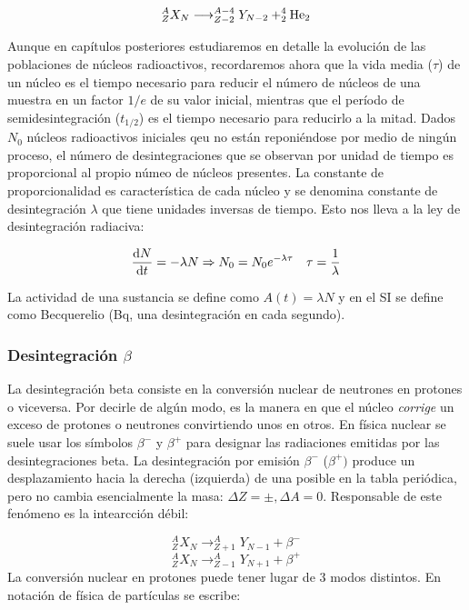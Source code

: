 \begin{equation}
    ^A_Z X_N \longrightarrow ^{A-4}_{Z-2} Y_{N-2} + ^4_2\text{He}_2
\end{equation}

Aunque en capítulos posteriores estudiaremos en detalle la evolución de las poblaciones de núcleos radioactivos, recordaremos ahora que la vida media ($\tau$) de un núcleo es el tiempo necesario para reducir el número de núcleos de una muestra en un factor $1/e$ de su valor inicial, mientras que el período de semidesintegración ($t_{1/2}$) es el tiempo necesario para reducirlo a la mitad. Dados $N_0$ núcleos radioactivos iniciales qeu no están reponiéndose por medio de ningún proceso, el número de desintegraciones que se observan por unidad de tiempo es proporcional al propio númeo de núcleos presentes. La constante de proporcionalidad es característica de cada núcleo y se denomina constante de desintegración $\lambda$ que tiene unidades inversas de tiempo. Esto nos lleva a la ley de desintegración radiaciva:

\begin{equation}
\frac{\mathrm{d} N}{\mathrm{d} t} = - \lambda N \Rightarrow N_0  = N_0 e^{-\lambda \tau} \quad \tau = \frac{1}{\lambda}
\end{equation}

La actividad de una sustancia se define como $A(t)=\lambda N$ y en el SI se define como Becquerelio (Bq, una desintegración en cada segundo).

\subsubsection{Desintegración $\beta$}

La desintegración beta consiste en la conversión nuclear de neutrones en protones o viceversa. Por decirle de algún modo, es la manera en que el núcleo \textit{corrige} un exceso de protones o neutrones convirtiendo unos en otros. En física nuclear se suele usar los símbolos $\beta^-$ y $\beta^+$ para designar las radiaciones emitidas por las desintegraciones beta. La desintegración por emisión $\beta^-$ ($\beta^+)$ produce un desplazamiento hacia la derecha (izquierda) de una posible en la tabla periódica, pero no cambia esencialmente la masa: $\Delta Z = \pm, \Delta A = 0$. Responsable de este fenómeno es la intearcción débil:

\begin{equation}
^A_Z X_N \longrightarrow ^A_{Z+1} Y_{N-1} + \beta^-
\end{equation}
\begin{equation}
^A_Z X_N \longrightarrow ^A_{Z-1} Y_{N+1} + \beta^+
\end{equation}
La conversión nuclear en protones puede tener lugar de 3 modos distintos. En notación de física de partículas se escribe:

